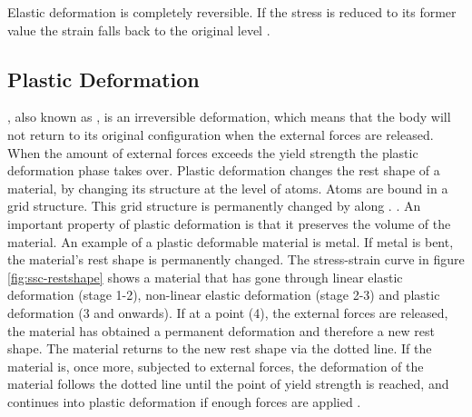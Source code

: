 Elastic deformation is
completely reversible. If the stress is reduced to its former value
the strain falls back to the original level
.

\subsection{Plastic Deformation}
, also known as , is an
irreversible deformation, which means that the body will not return to
its original configuration when the external forces are released. When
the amount of external forces exceeds the yield strength the plastic
deformation phase takes over.
%
Plastic deformation changes the rest shape of a material, by
changing its structure at the level of atoms. Atoms
are bound in a grid structure. This grid structure is
permanently changed by  along .
.
%
An important property of plastic deformation is that it preserves the
volume of the material.
%
An example of a plastic deformable material is metal. If metal is
bent, the material's rest shape is permanently changed.
%
The stress-strain curve in figure \vref{fig:ssc-restshape} shows a
material that has gone through linear elastic deformation (stage 1-2),
non-linear elastic deformation (stage 2-3) and plastic deformation (3
and onwards). If at a point (4), the external forces are 
released, the material has obtained a permanent deformation and
therefore a new rest shape. The material returns to the new rest
shape via the dotted line.
%
If the material is, once more, subjected to external forces, the
deformation of the material follows the dotted line until the point of
yield strength is reached, and continues into plastic deformation if
enough forces are applied .

